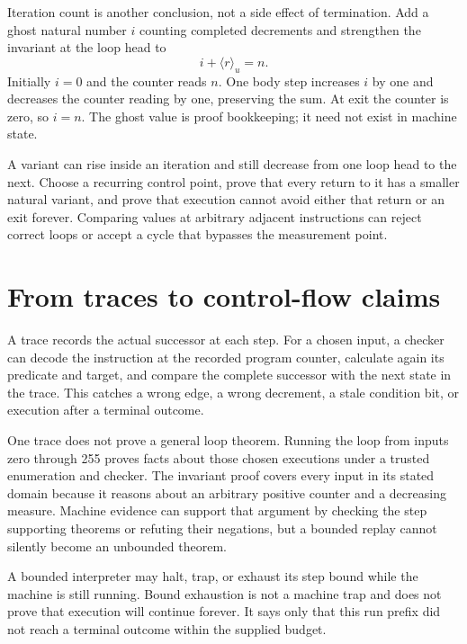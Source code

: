 Iteration count is another conclusion, not a side effect of termination. Add a
ghost natural number \(i\) counting completed decrements and strengthen the
invariant at the loop head to
\[
  i+\langle r\rangle_u=n.
\]
Initially \(i=0\) and the counter reads \(n\). One body step increases \(i\) by
one and decreases the counter reading by one, preserving the sum. At exit the
counter is zero, so \(i=n\). The ghost value is proof bookkeeping; it need not
exist in machine state.

\begin{proofkit}[title={Why the variant must be checked at one control point}]
A variant can rise inside an iteration and still decrease from one loop head
to the next. Choose a recurring control point, prove that every return to it
has a smaller natural variant, and prove that execution cannot avoid either
that return or an exit forever. Comparing values at arbitrary adjacent
instructions can reject correct loops or accept a cycle that bypasses the
measurement point.
\end{proofkit}

\section{From traces to control-flow claims}

A trace records the actual successor at each step. For a chosen input, a
checker can decode the instruction at the recorded program counter, calculate again
its predicate and target, and compare the complete successor with the next
state in the trace. This catches a wrong edge, a wrong decrement, a stale
condition bit, or execution after a terminal outcome.

One trace does not prove a general loop theorem. Running the loop from inputs
zero through 255 proves facts about those chosen executions under a trusted
enumeration and checker. The invariant proof covers every input in its stated
domain because it reasons about an arbitrary positive counter and a decreasing
measure. Machine evidence can support that argument by checking the step
supporting theorems or refuting their negations, but a bounded replay cannot silently
become an unbounded theorem.

\begin{definition}[title={A bounded run has three distinct endings}]
A bounded interpreter may halt, trap, or exhaust its step bound while the
machine is still running. Bound exhaustion is not a machine trap and does not
prove that execution will continue forever. It says only that this run prefix did not reach a terminal
outcome within the supplied budget.
\end{definition}

